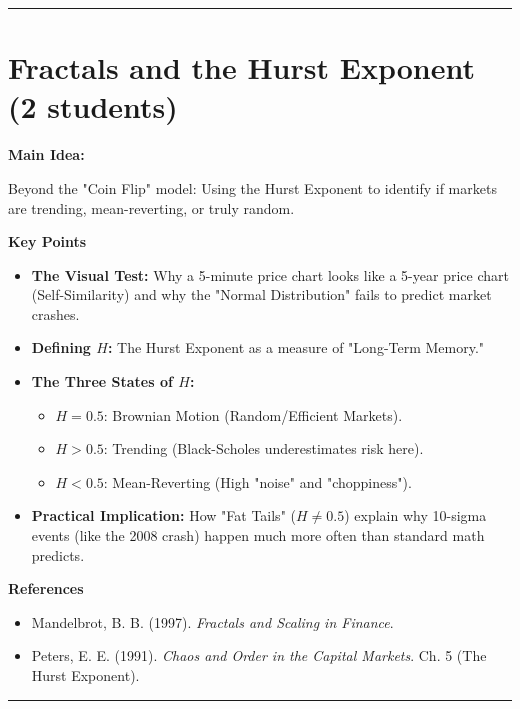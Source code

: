 \documentclass[12pt,a4paper]{article}
\begin{document}
\vspace{0.5cm}
\hrule
\vspace{0.5cm}

\section{Fractals and the Hurst Exponent (2 students)}

\textbf{Main Idea:}

Beyond the "Coin Flip" model: Using the Hurst Exponent to identify if markets are trending, mean-reverting, or truly random.

\medskip
\textbf{Key Points}
\begin{itemize}
\item \textbf{The Visual Test:} Why a 5-minute price chart looks like a 5-year price chart (Self-Similarity) and why the "Normal Distribution" fails to predict market crashes.

\item \textbf{Defining $H$:} The Hurst Exponent as a measure of "Long-Term Memory."

\item \textbf{The Three States of $H$:}
    \begin{itemize}
        \item $H=0.5$: Brownian Motion (Random/Efficient Markets).
        \item $H>0.5$: Trending (Black-Scholes underestimates risk here).
        \item $H<0.5$: Mean-Reverting (High "noise" and "choppiness").
    \end{itemize}

\item \textbf{Practical Implication:} How "Fat Tails" ($H \neq 0.5$) explain why 10-sigma events (like the 2008 crash) happen much more often than standard math predicts.

\end{itemize}

\medskip
\textbf{References}
\begin{itemize}
\item[-] Mandelbrot, B. B. (1997). \textit{Fractals and Scaling in Finance}.
\item[-] Peters, E. E. (1991). \textit{Chaos and Order in the Capital Markets}. Ch. 5 (The Hurst Exponent).
\end{itemize}

\vspace{0.5cm}
\hrule
\vspace{0.5cm}
\end{document}
